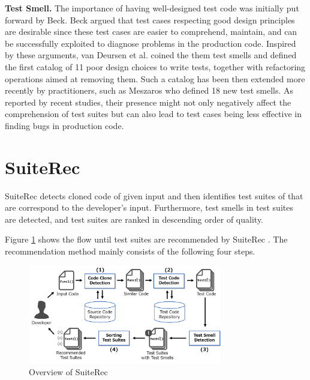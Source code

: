 \documentclass[conference]{IEEEtran}
\begin{document}
\textbf{Test Smell.} The importance of having well-designed test code was initially put forward by Beck\cite{b4}. Beck argued that test cases respecting good design principles are desirable since these test cases are easier to comprehend, maintain, and can be successfully exploited to diagnose problems in the production code. Inspired by these arguments, van Deursen et al.\cite{b7} coined the them test smells and defined the first catalog of 11 poor design choices to write tests, together with refactoring operations aimed at removing them. Such a catalog has been then extended more recently by practitioners, such as Meszaros\cite{b6} who defined 18 new test smells. As reported by recent studies, their presence might not only negatively affect the comprehension of test suites but can also lead to test cases being less effective in finding bugs in production code\cite{b8}.

\section{SuiteRec}
\textsf{SuiteRec} detects cloned code of given input and then identifies test suites of that are correspond to the developer’s input. Furthermore, test smells in test suites are detected, and test suites are ranked in descending order of quality.


Figure \ref{fig1} shows the flow until test suites are recommended by \textsf{SuiteRec} . The recommendation method mainly consists of the following four steps.


\begin{figure}[htbp]
\centerline{\includegraphics[width=8.5cm]{SuiteRec-outline.pdf}}
\caption{Overview of SuiteRec}
\label{fig1}
\end{figure}
\end{document}
